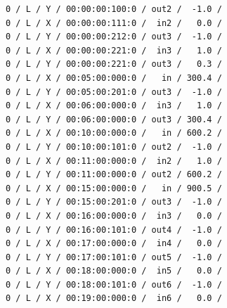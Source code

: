 \documentclass[10pt]{article}
\begin{document}
\begin{minipage}{1\textwidth}
	\centering
	\begin{lstlisting}
0 / L / Y / 00:00:00:100:0 / out2 /  -1.0 /
0 / L / X / 00:00:00:111:0 /  in2 /   0.0 /
0 / L / Y / 00:00:00:212:0 / out3 /  -1.0 /
0 / L / X / 00:00:00:221:0 /  in3 /   1.0 /
0 / L / Y / 00:00:00:221:0 / out3 /   0.3 /
0 / L / X / 00:05:00:000:0 /   in / 300.4 /
0 / L / Y / 00:05:00:201:0 / out3 /  -1.0 /
0 / L / X / 00:06:00:000:0 /  in3 /   1.0 /
0 / L / Y / 00:06:00:000:0 / out3 / 300.4 /
0 / L / X / 00:10:00:000:0 /   in / 600.2 /
0 / L / Y / 00:10:00:101:0 / out2 /  -1.0 /
0 / L / X / 00:11:00:000:0 /  in2 /   1.0 /
0 / L / Y / 00:11:00:000:0 / out2 / 600.2 /
0 / L / X / 00:15:00:000:0 /   in / 900.5 /
0 / L / Y / 00:15:00:201:0 / out3 /  -1.0 /
0 / L / X / 00:16:00:000:0 /  in3 /   0.0 /
0 / L / Y / 00:16:00:101:0 / out4 /  -1.0 /
0 / L / X / 00:17:00:000:0 /  in4 /   0.0 /
0 / L / Y / 00:17:00:101:0 / out5 /  -1.0 /
0 / L / X / 00:18:00:000:0 /  in5 /   0.0 /
0 / L / Y / 00:18:00:101:0 / out6 /  -1.0 /
0 / L / X / 00:19:00:000:0 /  in6 /   0.0 /
	\end{lstlisting}	
\end{minipage}
\end{document}
